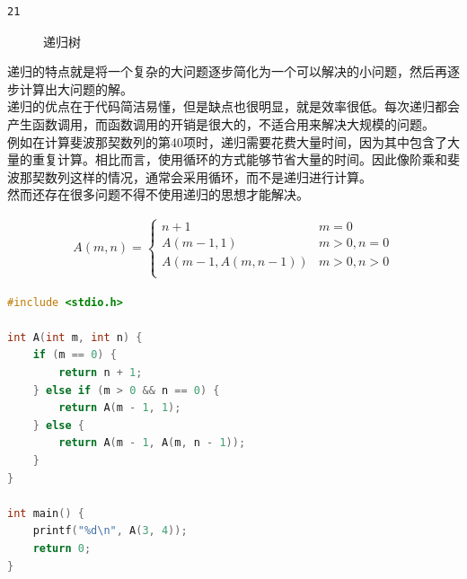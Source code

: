 \begin{tcolorbox}
	\begin{verbatim}
21
	\end{verbatim}
\end{tcolorbox}

\begin{figure}[H]
	\centering
	\caption{递归树}
\end{figure}

递归的特点就是将一个复杂的大问题逐步简化为一个可以解决的小问题，然后再逐步计算出大问题的解。\\

递归的优点在于代码简洁易懂，但是缺点也很明显，就是效率很低。每次递归都会产生函数调用，而函数调用的开销是很大的，不适合用来解决大规模的问题。\\

例如在计算斐波那契数列的第40项时，递归需要花费大量时间，因为其中包含了大量的重复计算。相比而言，使用循环的方式能够节省大量的时间。因此像阶乘和斐波那契数列这样的情况，通常会采用循环，而不是递归进行计算。\\

然而还存在很多问题不得不使用递归的思想才能解决。\\


\begin{align}\nonumber
	A(m, n) =
	\begin{cases}
		n + 1             & m = 0        \\
		A(m-1, 1)         & m > 0, n = 0 \\
		A(m-1, A(m, n-1)) & m > 0, n > 0 \\
	\end{cases}
\end{align}

\begin{lstlisting}[language=C]
#include <stdio.h>

int A(int m, int n) {
	if (m == 0) {
		return n + 1;
	} else if (m > 0 && n == 0) {
		return A(m - 1, 1);
	} else {
		return A(m - 1, A(m, n - 1));
	}
}

int main() {
	printf("%d\n", A(3, 4));
	return 0;
}
\end{lstlisting}


